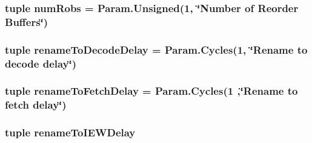 \hypertarget{classO3CPU_1_1DerivO3CPU_afa45ebeb163c7058a6ba074b27187095}{
\subsubsection[{numRobs}]{\setlength{\rightskip}{0pt plus 5cm}tuple {\bf numRobs} = Param.Unsigned(1, \char`\"{}Number of Reorder Buffers\char`\"{})}}
\label{classO3CPU_1_1DerivO3CPU_afa45ebeb163c7058a6ba074b27187095}
\hypertarget{classO3CPU_1_1DerivO3CPU_a4cd25aa163add4667be26df636d1d72d}{
\subsubsection[{renameToDecodeDelay}]{\setlength{\rightskip}{0pt plus 5cm}tuple {\bf renameToDecodeDelay} = Param.Cycles(1, \char`\"{}Rename to decode delay\char`\"{})}}
\label{classO3CPU_1_1DerivO3CPU_a4cd25aa163add4667be26df636d1d72d}
\hypertarget{classO3CPU_1_1DerivO3CPU_a8aaf587e0c65d740c68328f587f36b97}{
\subsubsection[{renameToFetchDelay}]{\setlength{\rightskip}{0pt plus 5cm}tuple {\bf renameToFetchDelay} = Param.Cycles(1 ,\char`\"{}Rename to fetch delay\char`\"{})}}
\label{classO3CPU_1_1DerivO3CPU_a8aaf587e0c65d740c68328f587f36b97}
\hypertarget{classO3CPU_1_1DerivO3CPU_acdec10386abd09a4724775d533fc65d4}{
\subsubsection[{renameToIEWDelay}]{\setlength{\rightskip}{0pt plus 5cm}tuple {\bf renameToIEWDelay}}}
